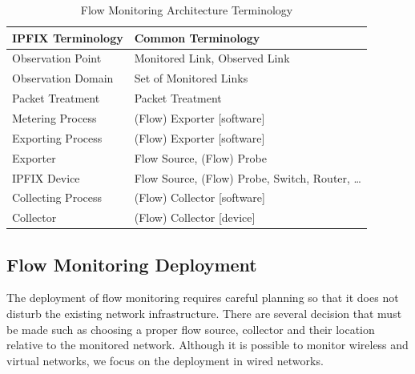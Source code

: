 \begin{table}[t!]
	\centering
	\begin{tabular}{ll}
	\toprule
		\textbf{IPFIX Terminology}  & \textbf{Common Terminology}                 \\ \midrule
		Observation Point   &  Monitored Link, Observed Link                      \\
		Observation Domain  &  Set of Monitored Links                             \\
		Packet Treatment    &  Packet Treatment                                   \\
		Metering Process    &  (Flow) Exporter [software]                         \\
		Exporting Process   &  (Flow) Exporter [software]                         \\
		Exporter            &  Flow Source, (Flow) Probe                          \\
		IPFIX Device        &  Flow Source, (Flow) Probe, Switch, Router, \ldots  \\
		Collecting Process  &  (Flow) Collector [software]                        \\
		Collector           &  (Flow) Collector [device]                          \\ \bottomrule
	\end{tabular}
	\caption{Flow Monitoring Architecture Terminology}
	\label{tab:flow_monitoring_terminology}
\end{table}


\subsection{Flow Monitoring Deployment}

The deployment of flow monitoring requires careful planning so that it does not disturb the existing network infrastructure. There are several decision that must be made such as choosing a proper flow source, collector and their location relative to the monitored network. Although it is possible to monitor wireless and virtual networks, we focus on the deployment in wired networks.

